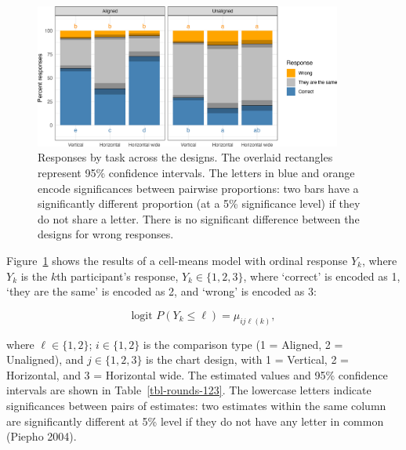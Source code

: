\documentclass[
]{jds}
\begin{document}
\begin{figure}[hbt]

{\centering \includegraphics[width=0.9\textwidth,height=\textheight]{./figures/fig-response-123-1.png}

}

\caption{\label{fig-response-123}Responses by task across the designs.
The overlaid rectangles represent 95\% confidence intervals. The letters
in blue and orange encode significances between pairwise proportions:
two bars have a significantly different proportion (at a 5\%
significance level) if they do not share a letter. There is no
significant difference between the designs for wrong responses.}

\end{figure}

Figure~\ref{fig-response-123} shows the results of a cell-means model
with ordinal response \(Y_k\), where \(Y_k\) is the \(k\)th
participant's response, \(Y_k \in \{1, 2, 3\}\), where `correct' is
encoded as 1, `they are the same' is encoded as 2, and `wrong' is
encoded as 3:

\[
\text{logit }P(Y_k \le \ell) = \mu_{ij\ell(k)},
\]

where \(\ell \in \{1, 2\}\); \(i \in \{1, 2\}\) is the comparison type
(1 = Aligned, 2 = Unaligned), and \(j \in \{1, 2, 3\}\) is the chart
design, with 1 = Vertical, 2 = Horizontal, and 3 = Horizontal wide. The
estimated values and 95\% confidence intervals are shown in
Table~\ref{tbl-rounds-123}. The lowercase letters indicate significances
between pairs of estimates: two estimates within the same column are
significantly different at 5\% level if they do not have any letter in
common (Piepho 2004).
\end{document}
